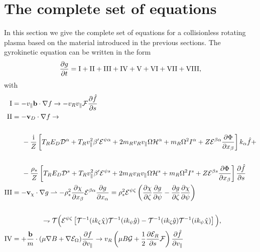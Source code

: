 \section{The complete set of equations}
\label{equations}
In this section we give the complete set of equations for a collisionless rotating plasma based on the material introduced 
in the previous sections. The gyrokinetic equation can be written in the form 
\begin{equation}
\label{eqs:complete-set}
\frac{\partial g}{\partial t} = {\rm I} + {\rm II} + {\rm III} + {\rm IV} + {\rm V} + {\rm VI}+ {\rm VII}+ {\rm VIII},
\end{equation}
with 
\begin{align}
\label{eq:I}{\rm I} &= - v_\parallel {\bf b} \cdot \nabla f \rightarrow - v_R v_{\parallel} {\cal F} \pd{\hat f}{s}
\\
\label{eq:II}{\rm II} &= - {\bf v}_D \cdot \nabla f \rightarrow \cr 
\nonumber\\
& \hspace{0.5cm} -\frac{{\rm i}}{Z} \left[ T_R E_D {\cal D}^\alpha + T_R v_{\parallel}^2 \beta^\prime  {\cal E}^{\psi \alpha} + 2 m_R v_R v_{\parallel}\Omega{\cal
H}^\alpha + m_R \Omega^2 I^\alpha + Z{\cal E}^{\beta \alpha} \pd{\Phi}{x_\beta}\right] 
k_\alpha \hat f+ \cr 
\nonumber\\
& \hspace{0.5cm} -\frac{\rho_*}{Z} \left[ T_R E_D {\cal D}^s + T_R v_{\parallel}^2 \beta^\prime  {\cal E}^{\psi s} + 2 m_R v_R v_{\parallel}\Omega{\cal
H}^s + m_R \Omega^2 I^s + Z{\cal E}^{\beta s} \pd{\Phi}{x_\beta}\right] \pd{\hat f}{s}\\
\label{eq:nl-term}
{\rm III} &= - {\bf v}_\chi \cdot \nabla g \rightharpoonup - \rho_*^2 \pd{\chi}{x_\beta} {\cal E}^{\beta \alpha} \pd{g}{x_\alpha}
= {\rho_*^2 {\cal E}^{\psi \zeta}}\left({\pd{\chi}{\zeta} \pd{g}{\psi} - \pd{g}{\zeta}\pd{{ \chi }}{\psi}}\right) \cr 
\nonumber\\
& \hspace{1.5cm} \rightharpoondown \mathcal{T}\Big({\cal E}^{\psi \zeta}\left[\mathcal{T}^{-1}(ik_{\zeta} \hat{ \chi }) \mathcal{T}^{-1}(ik_{\psi} \hat g) -
\mathcal{T}^{-1}(ik_{\zeta} \hat g) \mathcal{T}^{-1}(ik_{\psi} \hat{ \chi })\right]\Big),
\\
\label{eq:IV}{\rm IV} &= + {{\bf b} \over m }\cdot(\mu \nabla B + \nabla \cfen) \pd{f}{v_\parallel} \rightarrow
v_R \left(\mu B {\cal G} + {1 \over 2} \pd{{\cal E}_R}{s} {\cal F} \right) \pd{\hat f}{v_{\parallel}}

\end{align}
